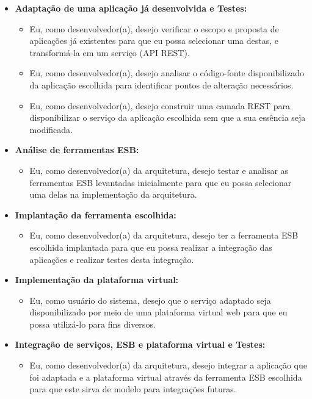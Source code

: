 \begin{itemize}
\item \textbf{Adaptação de uma aplicação já desenvolvida e Testes:} 

\begin{itemize}
\item Eu, como desenvolvedor(a), desejo verificar o escopo e proposta de aplicações já existentes para que eu possa selecionar uma destas, e transformá-la em um serviço (API REST).
\item Eu, como desenvolvedor(a), desejo analisar o código-fonte disponibilizado da aplicação escolhida para identificar pontos de alteração necessários.
\item Eu, como desenvolvedor(a), desejo construir uma camada REST para disponibilizar o serviço da aplicação escolhida sem  que a sua essência seja modificada.
\end{itemize}

\item \textbf{Análise de ferramentas ESB:} 
\begin{itemize}
\item Eu, como desenvolvedor(a) da arquitetura, desejo testar e analisar as ferramentas ESB levantadas inicialmente para que eu possa selecionar uma delas na implementação da arquitetura.
\end{itemize}

\item \textbf{Implantação da ferramenta escolhida:} 
\begin{itemize}
\item Eu, como desenvolvedor(a) da arquitetura, desejo ter a ferramenta ESB escolhida implantada para que eu possa realizar a integração das aplicações e realizar testes desta integração.
\end{itemize}

\item \textbf{Implementação da plataforma virtual:} 
\begin{itemize}
\item Eu, como usuário do sistema, desejo que o serviço adaptado seja disponibilizado por meio de uma plataforma virtual web para que eu possa utilizá-lo para fins diversos.
\end{itemize}

\item \textbf{Integração de serviços, ESB e plataforma virtual e Testes:} 
\begin{itemize}
\item Eu, como desenvolvedor(a) da arquitetura, desejo integrar a aplicação que foi adaptada e a plataforma virtual através da ferramenta ESB escolhida para que este sirva de modelo para integrações futuras.
\end{itemize}


\end{itemize}
